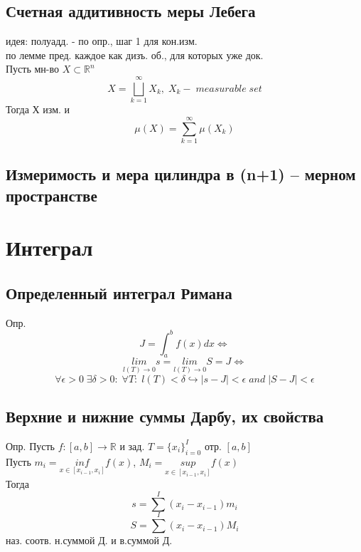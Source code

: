 \documentclass{article}
\begin{document}
\subsection{Счетная аддитивность меры Лебега}
идея: полуадд. - по опр., шаг 1 для кон.изм.\\
по лемме пред. каждое как дизъ. об., для которых уже док. \\
Пусть мн-во $X \subset \mathbb R^n$
\begin{equation*}
    X = \bigsqcup_{k=1}^{\infty} X_k, \; X_k - \; measurable \; set
\end{equation*}
Тогда Х изм. и
\begin{equation*}
    \mu (X) = \sum_{k=1}^\infty \mu ( X_k )
\end{equation*}
\subsection{Измеримость и мера цилиндра в (n+1) – мерном пространстве}


\section{Интеграл}
\subsection{Определенный интеграл Римана}
Опр.
\begin{equation*}
    J = \int_a^b f(x) dx \Leftrightarrow
\end{equation*}
\begin{equation*}
    \underset{l(T) \rightarrow 0}{lim} s = \underset{l(T) \rightarrow 0}{lim} S = J \Leftrightarrow
\end{equation*}
\begin{equation*}
    \forall \epsilon >0 \; \exists \delta > 0: \; \forall T: \; l(T)<\delta \hookrightarrow |s-J|<\epsilon \; and \; |S-J|<\epsilon
\end{equation*}
\subsection{Верхние и нижние суммы Дарбу, их свойства}
Опр. Пусть $f:[a,b] \rightarrow \mathbb R$ и зад. $T = \{ x_i \}_{i=0}^I$ отр. $[a,b]$ \\
Пусть $ m_i = \underset{x \in [x_{i-1}, x_i]}{inf} f(x) $, $ M_i = \underset{x \in [x_{i-1}, x_i]}{sup} f(x) $ \\
Тогда
\begin{equation*}
    s = \sum^I (x_i - x_{i-1})m_i
\end{equation*}
\begin{equation*}
    S = \sum^I (x_i - x_{i-1})M_i
\end{equation*}
наз. соотв. н.суммой Д. и в.суммой Д.
\end{document}
